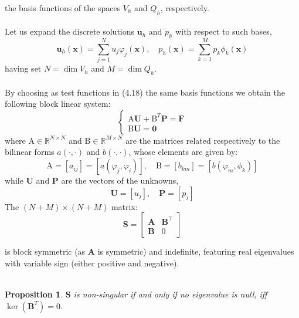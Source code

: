 \documentclass[11pt]{book}
\newtheorem{proposition}{Proposition}
\begin{document}
the basis functions of the spaces $V_{h}$ and $Q_{h}$, respectively.\\ \\ Let us expand the discrete solutions $\mathbf{u}_{h}$ and $p_{h}$ with respect to such bases,
\begin{equation}
\mathbf{u}_{h}(\mathbf{x})=\sum_{j=1}^{N} u_{j} \varphi_{j}(\mathbf{x}), \quad p_{h}(\mathbf{x})=\sum_{k=1}^{M} p_{k} \phi_{k}(\mathbf{x})
\end{equation}
having set $N=\operatorname{dim} V_{h}$ and $M=\operatorname{dim} Q_{h}$. \\ \\
By choosing as test functions in (4.18) the same basis functions we obtain the following block linear system:
\begin{equation}
    \left\{\begin{array}{l}
\mathrm{A} \mathbf{U}+\mathrm{B}^{T} \mathbf{P}=\mathbf{F} \\
\mathrm{B} \mathbf{U}=\mathbf{0}
\end{array}\right.
\end{equation}
where $\mathrm{A} \in \mathbb{R}^{N \times N}$ and $\mathrm{B} \in \mathbb{R}^{M \times N}$ are the matrices related respectively to the bilinear forms $a(\cdot, \cdot)$ and $b(\cdot, \cdot)$, whose elements are given by:
$$
\mathrm{A}=\left[a_{i j}\right]=\left[a\left(\varphi_{j}, \varphi_{i}\right)\right], \quad \mathrm{B}=\left[b_{k m}\right]=\left[b\left(\varphi_{m}, \phi_{k}\right)\right]
$$
while $\mathbf{U}$ and $\mathbf{P}$ are the vectors of the unknowns,
$$
\mathbf{U}=\left[u_{j}\right], \quad \mathbf{P}=\left[p_{j}\right]
$$
The $(N+M) \times (N+M)$ matrix:
\begin{equation}
\mathbf{S} = 
\begin{bmatrix}
\mathbf{A} & \mathbf{B}^{\top} \\
\mathbf{B} & 0
\end{bmatrix}
\end{equation}

is block symmetric (as $\mathbf{A}$ is symmetric) and indefinite, featuring real eigenvalues with variable sign (either positive and negative).\\ \\
\begin{proposition}
    $\mathbf{S}$ is non-singular if and only if no eigenvalue is null, iff $\operatorname{ker}(\mathbf{B}^T)=0$.
\end{proposition}
\end{document}
